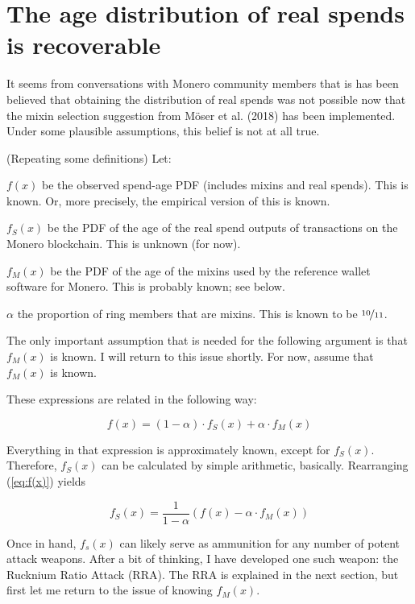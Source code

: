 \documentclass[english]{paper}
\begin{document}
\section{The age distribution of real spends is recoverable}

It seems from conversations with Monero community members that is
has been believed that obtaining the distribution of real spends was
not possible now that the mixin selection suggestion from M{\"o}ser et
al. (2018) has been implemented. Under some plausible assumptions,
this belief is not at all true.

(Repeating some definitions) Let:

$f(x)$ be the observed spend-age PDF (includes mixins and real spends).
This is known. Or, more precisely, the empirical version of this is
known.

$f_{S}(x)$ be the PDF of the age of the real spend outputs of transactions
on the Monero blockchain. This is unknown (for now).

$f_{M}(x)$ be the PDF of the age of the mixins used by the reference
wallet software for Monero. This is probably known; see below.

$\alpha$ the proportion of ring members that are mixins. This is
known to be $\nicefrac{10}{11}$.

The only important assumption that is needed for the following argument
is that $f_{M}(x)$ is known. I will return to this issue shortly.
For now, assume that $f_{M}(x)$ is known.

These expressions are related in the following way:

\begin{equation}
f(x)=(1-\alpha)\cdot f_{S}(x)+\alpha\cdot f_{M}(x)\label{eq:f(x)}
\end{equation}

Everything in that expression is approximately known, except for $f_{S}(x)$.
Therefore, $f_{S}(x)$ can be calculated by simple arithmetic, basically.
Rearranging (\ref{eq:f(x)}) yields

\begin{equation}
f_{S}(x)=\frac{1}{1-\alpha}\left(f(x)-\alpha\cdot f_{M}(x)\right)\label{eq:f_S(x)}
\end{equation}

Once in hand, $f_{s}(x)$ can likely serve as ammunition for any number
of potent attack weapons. After a bit of thinking, I have developed
one such weapon: the Rucknium Ratio Attack (RRA). The RRA is explained
in the next section, but first let me return to the issue of knowing
$f_{M}(x)$.
\end{document}
